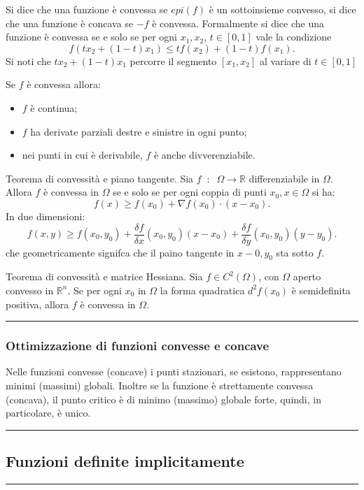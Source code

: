 Si dice che una funzione è convessa se $epi(f)$ è un sottoinsieme convesso, si dice che una funzione è concava se $-f$ è convessa.\newline
Formalmente si dice che una funzione è convessa se e solo se per ogni $x_1,x_2$, $t \in [0,1]$ vale la condizione
\[
    f(tx_2 + (1-t)x_1) \leq tf(x_2) + (1-t)f(x_1).
\]
Si noti che $tx_2 + (1-t)x_1$ percorre il segmento $[x_1,x_2]$ al variare di $t \in[0,1]$\newline

Se $f$ è convessa allora:
\begin{itemize}
    \item $f$ è continua;
    \item $f$ ha derivate parziali destre e sinistre in ogni punto;
    \item nei punti in cui è derivabile, $f$ è anche divverenziabile.
\end{itemize}

Teorema di convessità e piano tangente. Sia $f \;\;:\;\; \Omega \rightarrow \mathbb{R}$ differenziabile in $\Omega$. Allora $f$ è convessa in $\Omega$ se e solo se per ogni coppia di punti $x_0, x \in \Omega$ si ha:
\[
    f(x) \geq f(x_0) + \nabla f(x_0) \cdot (x-x_0).
\]
In due dimensioni:
\[
    f(x,y) \geq f(x_0,y_0) + \frac{\delta f}{\delta x}(x_0,y_0)(x-x_0)+\frac{\delta f}{\delta y}(x_0, y_0)(y-y_0).
\]
che geometricamente signifca che il paino tangente in $x-0, y_0$ sta sotto $f$.\newline

Teorema di convessità e matrice Hessiana. Sia $f \in C^2(\Omega)$, con $\Omega$ aperto convesso in $\mathbb{R}^n$. Se per ogni $x_0$ in $\Omega$ la forma quadratica $d^2f(x_0)$ è semidefinita positiva, allora $f$ è convessa in $\Omega$. \newline
\rule{\textwidth}{0.4pt}
\subsubsection*{Ottimizzazione di funzioni convesse e concave}
Nelle funzioni convesse (concave) i punti stazionari, se esistono, rappresentano minimi (massimi) globali. Inoltre se la funzione è strettamente convessa (concava), il punto critico è di minimo (massimo) globale forte, quindi, in particolare, è unico. \newline
\rule{\textwidth}{2pt}
\subsection*{Funzioni definite implicitamente}
\rule{\textwidth}{0.4pt}

